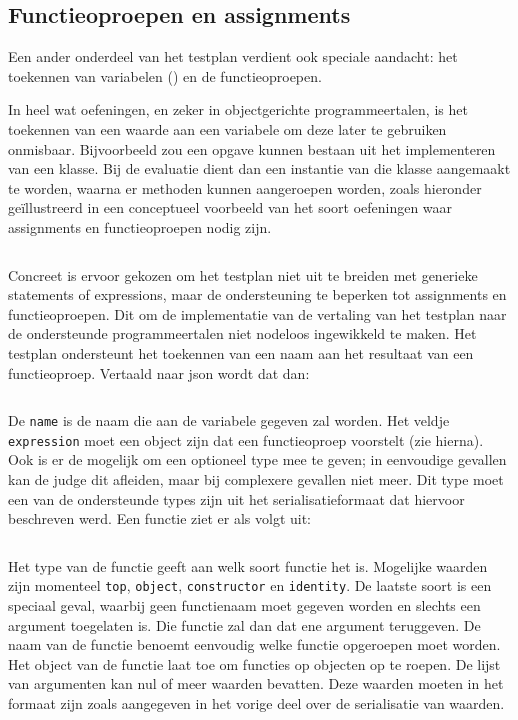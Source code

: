 \subsection{Functieoproepen en assignments}\label{subsec:functieoproepen}

Een ander onderdeel van het testplan verdient ook speciale aandacht: het toekennen van variabelen () en de functieoproepen.

In heel wat oefeningen, en zeker in objectgerichte programmeertalen, is het toekennen van een waarde aan een variabele om deze later te gebruiken onmisbaar.
Bijvoorbeeld zou een opgave kunnen bestaan uit het implementeren van een klasse.
Bij de evaluatie dient dan een instantie van die klasse aangemaakt te worden, waarna er methoden kunnen aangeroepen worden, zoals hieronder geïllustreerd in een conceptueel voorbeeld van het soort oefeningen waar assignments en functieoproepen nodig zijn.

\inputminted{java}{code/assignment.jshell}

Concreet is ervoor gekozen om het testplan niet uit te breiden met generieke statements of expressions, maar de ondersteuning te beperken tot assignments en functieoproepen.
Dit om de implementatie van de vertaling van het testplan naar de ondersteunde programmeertalen niet nodeloos ingewikkeld te maken.
Het testplan ondersteunt het toekennen van een naam aan het resultaat van een functieoproep.
Vertaald naar json wordt dat dan:

\inputminted{json}{code/assignment.json}

De \texttt{name} is de naam die aan de variabele gegeven zal worden.
Het veldje \texttt{expression} moet een object zijn dat een functieoproep voorstelt (zie hierna).
Ook is er de mogelijk om een optioneel type mee te geven;
in eenvoudige gevallen kan de judge dit afleiden, maar bij complexere gevallen niet meer.
Dit type moet een van de ondersteunde types zijn uit het serialisatieformaat dat hiervoor beschreven werd.
Een functie ziet er als volgt uit:

\inputminted{json}{code/function.json}

Het type van de functie geeft aan welk soort functie het is.
Mogelijke waarden zijn momenteel \texttt{top}, \texttt{object}, \texttt{constructor} en \texttt{identity}.
De laatste soort is een speciaal geval, waarbij geen functienaam moet gegeven worden en slechts een argument toegelaten is.
Die functie zal dan dat ene argument teruggeven.
De naam van de functie benoemt eenvoudig welke functie opgeroepen moet worden.
Het object van de functie laat toe om functies op objecten op te roepen.
De lijst van argumenten kan nul of meer waarden bevatten.
Deze waarden moeten in het formaat zijn zoals aangegeven in het vorige deel over de serialisatie van waarden.

